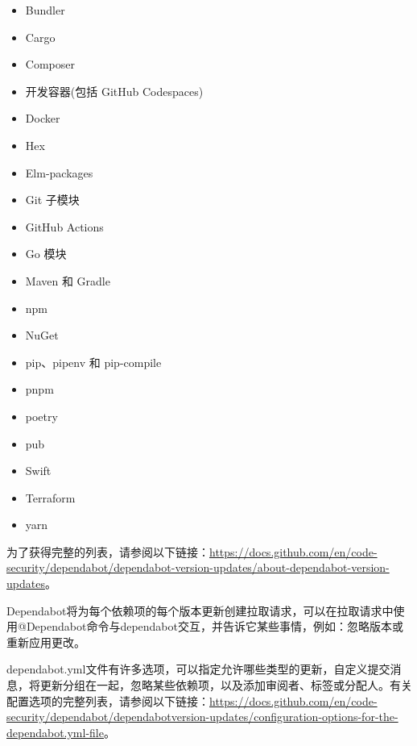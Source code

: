 \begin{itemize}
\item 
Bundler

\item 
Cargo

\item 
Composer

\item 
开发容器(包括 GitHub Codespaces)

\item 
Docker

\item 
Hex

\item 
Elm-packages

\item 
Git 子模块

\item 
GitHub Actions

\item 
Go 模块

\item 
Maven 和 Gradle

\item 
npm

\item 
NuGet

\item 
pip、pipenv 和 pip-compile

\item 
pnpm

\item 
poetry

\item 
pub

\item 
Swift

\item 
Terraform

\item 
yarn
\end{itemize}

为了获得完整的列表，请参阅以下链接：\url{https://docs.github.com/en/code-security/dependabot/dependabot-version-updates/about-dependabot-version-updates}。

Dependabot将为每个依赖项的每个版本更新创建拉取请求，可以在拉取请求中使用@Dependabot命令与dependabot交互，并告诉它某些事情，例如：忽略版本或重新应用更改。

dependabot.yml文件有许多选项，可以指定允许哪些类型的更新，自定义提交消息，将更新分组在一起，忽略某些依赖项，以及添加审阅者、标签或分配人。有关配置选项的完整列表，请参阅以下链接：\url{https://docs.github.com/en/code-security/dependabot/dependabotversion-updates/configuration-options-for-the-dependabot.yml-file}。

